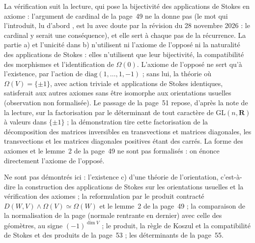 \begin{remarque}
La vérification suit la lecture, qui pose la bijectivité des applications de Stokes en axiome : l'argument de cardinal de la page~49 ne la donne pas (le mot qui l'introduit, lu d'abord , est lu avec doute  par la révision du 28 novembre 2026 : le cardinal y serait une conséquence), et elle sert à chaque pas de la récurrence. La partie a) et l'unicité dans b) n'utilisent ni l'axiome de l'opposé ni la naturalité des applications de Stokes : elles n'utilisent que leur bijectivité, la compatibilité des morphismes et l'identification de $\Omega(0)$. L'axiome de l'opposé ne sert qu'à l'existence, par l'action de $\mathrm{diag}(1, \ldots, 1, -1)$ ; sans lui, la théorie où $\Omega(V) = \{\pm 1\}$, avec action triviale et applications de Stokes identiques, satisferait aux autres axiomes sans être isomorphe aux orientations usuelles (observation non formalisée). Le passage  de la page~51 repose, d'après la note de la lecture, sur la factorisation par le déterminant de tout caractère de $\mathrm{GL}(n, \mathbf R)$ à valeurs dans $\{\pm 1\}$ ; la démonstration tire cette factorisation de la décomposition des matrices inversibles en transvections et matrices diagonales, les transvections et les matrices diagonales positives étant des carrés. La forme  des axiomes et le lemme~2 de la page~49 ne sont pas formalisés : on énonce directement l'axiome de l'opposé.
\end{remarque}

Ne sont pas démontrés ici : l'existence c) d'une théorie de l'orientation, c'est-à-dire la construction des applications de Stokes sur les orientations usuelles et la vérification des axiomes ; la reformulation par le produit contracté $D(W, V) \wedge \Omega(V) \simeq \Omega(W)$ et le lemme~2 de la page~49 ; la comparaison de la normalisation de la page (normale rentrante en dernier) avec celle des géomètres, au signe $(-1)^{\dim V}$ ; le produit, la règle de Koszul et la compatibilité de Stokes et des produits de la page~53 ; les déterminants de la page~55.
